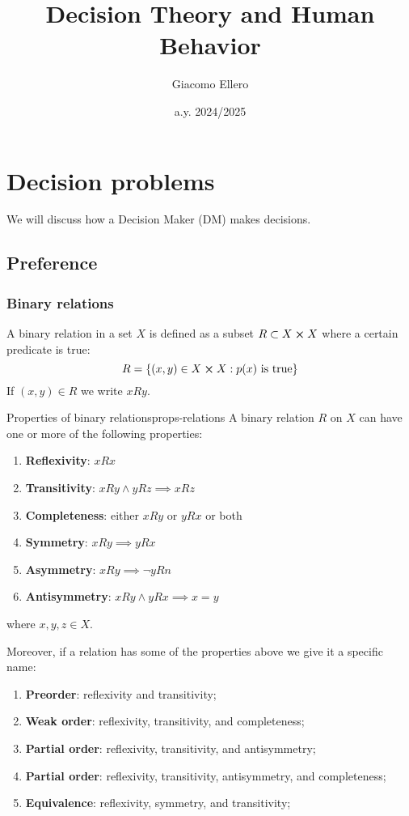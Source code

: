 \documentclass[12pt]{extarticle}
\title{Decision Theory and Human Behavior}
\author{Giacomo Ellero}
\date{a.y. 2024/2025}
\begin{document}
\firstpage

\section{Decision problems}

We will discuss how a Decision Maker (DM) makes decisions.

\subsection{Preference}

\subsubsection{Binary relations}

A binary relation in a set $X$ is defined as a subset $R \subset X \cross X$ where a certain predicate is true:
\begin{equation}
    R = \{ (x, y) \in X \cross X : p(x) \text{ is true}\}
\end{equation}
If $(x, y) \in R$ we write $xRy$.

\begin{definition}{Properties of binary relations}{props-relations}
    A binary relation $R$ on $X$ can have one or more of the following properties:
    \begin{enumerate}
        \item \textbf{Reflexivity}: $xRx$
        \item \textbf{Transitivity}: $xRy \land yRz \implies xRz$
        \item \textbf{Completeness}: either $xRy$ or $yRx$ or both
        \item \textbf{Symmetry}: $xRy \implies yRx$
        \item \textbf{Asymmetry}: $xRy \implies \lnot yRn$
        \item \textbf{Antisymmetry}: $xRy \land yRx \implies x = y$
    \end{enumerate}
    where $x, y, z \in X$.

    Moreover, if a relation has some of the properties above we give it a specific name:
    \begin{enumerate}
        \item \textbf{Preorder}: reflexivity and transitivity;
        \item \textbf{Weak order}: reflexivity, transitivity, and completeness;
        \item \textbf{Partial order}: reflexivity, transitivity, and antisymmetry;
        \item \textbf{Partial order}: reflexivity, transitivity, antisymmetry, and completeness;
        \item \textbf{Equivalence}: reflexivity, symmetry, and transitivity;
    \end{enumerate}
\end{definition}
\end{document}
